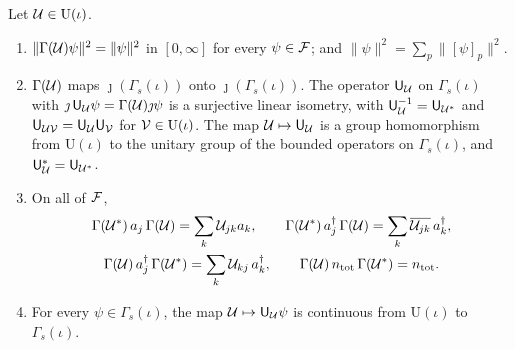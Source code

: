 \begin{vetdenv}
\begin{theorem}\label{thm:sq-unitary}
Let $\mathcal U\in\mathrm U(\iota)$.
\begin{enumerate}
\item[(a)] $\lVert\Gamma(\mathcal U)\psi\rVert^2=\lVert\psi\rVert^2$ in $[0,\infty]$ for every $\psi\in\mathcal F$; and
$\lVert\psi\rVert^2=\sum_p\lVert[\psi]_p\rVert^2$.
\item[(b)] $\Gamma(\mathcal U)$ maps $\jmath(\Gamma_s(\iota))$ onto $\jmath(\Gamma_s(\iota))$. The operator $\mathsf U_\mathcal U$ on
$\Gamma_s(\iota)$ with $\jmath\,\mathsf U_\mathcal U\psi=\Gamma(\mathcal U)\jmath\psi$ is a surjective linear isometry, with
$\mathsf U_\mathcal U^{-1}=\mathsf U_{\mathcal U^*}$ and $\mathsf U_{\mathcal U\mathcal V}=\mathsf U_\mathcal U\mathsf U_\mathcal V$ for $\mathcal V\in\mathrm U(\iota)$. The map $\mathcal U\mapsto\mathsf U_\mathcal U$ is a
group homomorphism from $\mathrm U(\iota)$ to the unitary group of the bounded operators on $\Gamma_s(\iota)$, and
$\mathsf U_\mathcal U^*=\mathsf U_{\mathcal U^*}$.
\item[(c)] On all of $\mathcal F$,
\begin{gather*}
 \Gamma(\mathcal U^*)\,a_j\,\Gamma(\mathcal U)=\sum_k\mathcal U_{jk}a_k,\qquad
 \Gamma(\mathcal U^*)\,a_j^\dagger\,\Gamma(\mathcal U)=\sum_k\overline{\mathcal U_{jk}}\,a_k^\dagger,\\
 \Gamma(\mathcal U)\,a_j^\dagger\,\Gamma(\mathcal U^*)=\sum_k\mathcal U_{kj}\,a_k^\dagger,\qquad
 \Gamma(\mathcal U)\,n_{\mathrm{tot}}\,\Gamma(\mathcal U^*)=n_{\mathrm{tot}} .
\end{gather*}
\item[(d)] For every $\psi\in\Gamma_s(\iota)$, the map $\mathcal U\mapsto\mathsf U_\mathcal U\psi$ is continuous from $\mathrm U(\iota)$ to
$\Gamma_s(\iota)$.
\end{enumerate}
\end{theorem}


\end{vetdenv}
